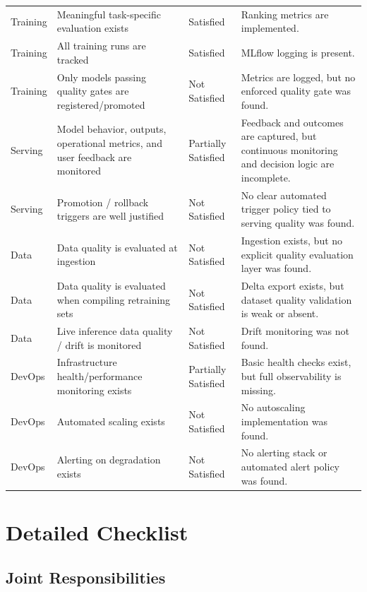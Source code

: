 \documentclass[11pt,a4paper]{article}
\begin{document}
\begin{longtable}{P{2.2cm}P{5.3cm}P{2.4cm}P{4.6cm}}
Training & Meaningful task-specific evaluation exists & Satisfied & Ranking metrics are implemented. \\
Training & All training runs are tracked & Satisfied & MLflow logging is present. \\
Training & Only models passing quality gates are registered/promoted & Not Satisfied & Metrics are logged, but no enforced quality gate was found. \\
Serving & Model behavior, outputs, operational metrics, and user feedback are monitored & Partially Satisfied & Feedback and outcomes are captured, but continuous monitoring and decision logic are incomplete. \\
Serving & Promotion / rollback triggers are well justified & Not Satisfied & No clear automated trigger policy tied to serving quality was found. \\
Data & Data quality is evaluated at ingestion & Not Satisfied & Ingestion exists, but no explicit quality evaluation layer was found. \\
Data & Data quality is evaluated when compiling retraining sets & Not Satisfied & Delta export exists, but dataset quality validation is weak or absent. \\
Data & Live inference data quality / drift is monitored & Not Satisfied & Drift monitoring was not found. \\
DevOps & Infrastructure health/performance monitoring exists & Partially Satisfied & Basic health checks exist, but full observability is missing. \\
DevOps & Automated scaling exists & Not Satisfied & No autoscaling implementation was found. \\
DevOps & Alerting on degradation exists & Not Satisfied & No alerting stack or automated alert policy was found. \\
\bottomrule
\end{longtable}

\section{Detailed Checklist}

\subsection{Joint Responsibilities}
\end{document}
